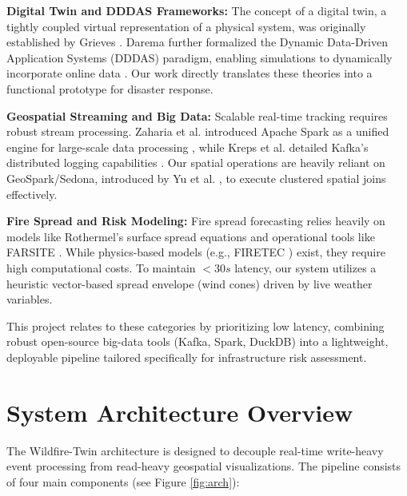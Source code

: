 \documentclass[acmsmall,screen,nonacm]{acmart}
\begin{document}
\textbf{Digital Twin and DDDAS Frameworks:} The concept of a digital twin, a tightly coupled virtual representation of a physical system, was originally established by Grieves \cite{grieves2014digitaltwin}. Darema further formalized the Dynamic Data-Driven Application Systems (DDDAS) paradigm, enabling simulations to dynamically incorporate online data \cite{darema2004dddas}. Our work directly translates these theories into a functional prototype for disaster response.

\textbf{Geospatial Streaming and Big Data:} Scalable real-time tracking requires robust stream processing. Zaharia et al. introduced Apache Spark as a unified engine for large-scale data processing \cite{zaharia2016spark}, while Kreps et al. detailed Kafka's distributed logging capabilities \cite{kreps2011kafka}. Our spatial operations are heavily reliant on GeoSpark/Sedona, introduced by Yu et al. \cite{yu2019geospark}, to execute clustered spatial joins effectively.

\textbf{Fire Spread and Risk Modeling:} Fire spread forecasting relies heavily on models like Rothermel's surface spread equations \cite{rothermel1972spread} and operational tools like FARSITE \cite{finney1998farsite}. While physics-based models (e.g., FIRETEC \cite{linn2002firetec}) exist, they require high computational costs. To maintain $<30s$ latency, our system utilizes a heuristic vector-based spread envelope (wind cones) driven by live weather variables.

This project relates to these categories by prioritizing low latency, combining robust open-source big-data tools (Kafka, Spark, DuckDB) into a lightweight, deployable pipeline tailored specifically for infrastructure risk assessment.

\section{System Architecture Overview}
The Wildfire-Twin architecture is designed to decouple real-time write-heavy event processing from read-heavy geospatial visualizations. The pipeline consists of four main components (see Figure \ref{fig:arch}):
\end{document}
